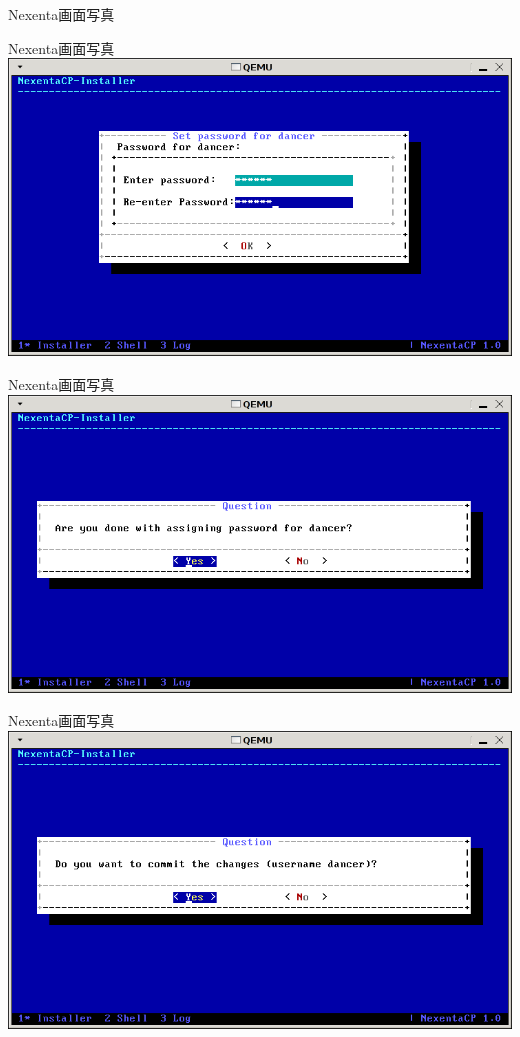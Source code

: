 \documentclass[cjk,dvipdfmx,12pt]{beamer}
\begin{document}
\begin{frame}{Nexenta画面写真}
\end{frame}\begin{frame}{Nexenta画面写真} 
\includegraphics[width=1.0\hsize]{image200804/nexenta13.png}
\end{frame}\begin{frame}{Nexenta画面写真} 
\includegraphics[width=1.0\hsize]{image200804/nexenta14.png}
\end{frame}\begin{frame}{Nexenta画面写真} 
\includegraphics[width=1.0\hsize]{image200804/nexenta15.png}

\end{frame}
\end{document}
